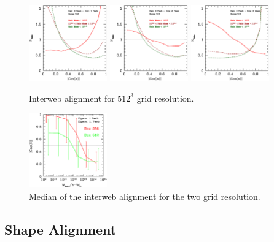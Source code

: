 \documentclass[usenatbib]{mn2e}
\begin{document}
\begin{figure}
\includegraphics[width=0.30\textwidth]{../plot2/512/512_T3V1.ps}
\includegraphics[width=0.30\textwidth]{../plot2/512/512_T3V2.ps}
\includegraphics[width=0.30\textwidth]{../plot2/512/512_T3V3.ps}
\caption{Interweb alignment for $512^3$ grid resolution.}
\end{figure}

\begin{figure}
\includegraphics[width=0.30\textwidth]{../plot2/Mass/Web.ps}
\caption{Median of the interweb alignment for the two grid resolution.}
\end{figure}

\subsection{Shape Alignment}
\end{document}
